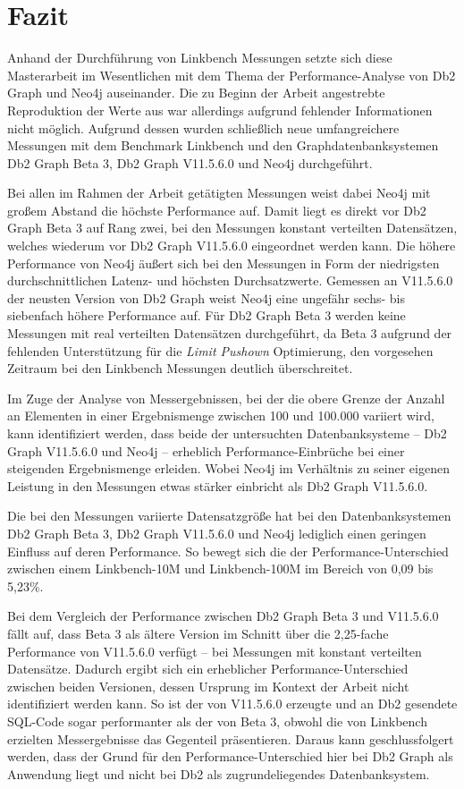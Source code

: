 \chapter{Fazit}
\label{fazit}
Anhand der Durchführung von Linkbench Messungen setzte sich diese Masterarbeit im Wesentlichen mit dem Thema der Performance-Analyse von Db2 Graph und Neo4j auseinander. Die zu Beginn der Arbeit angestrebte Reproduktion der Werte aus \cite{sigmod_tian} war allerdings aufgrund fehlender Informationen nicht möglich. Aufgrund dessen wurden schließlich neue umfangreichere Messungen mit dem Benchmark Linkbench und den Graphdatenbanksystemen Db2 Graph Beta 3, Db2 Graph V11.5.6.0 und Neo4j durchgeführt. 

Bei allen im Rahmen der Arbeit getätigten Messungen weist dabei Neo4j mit großem Abstand die höchste Performance auf. Damit liegt es direkt vor Db2 Graph Beta 3 auf Rang zwei, bei den Messungen konstant verteilten Datensätzen, welches wiederum vor Db2 Graph V11.5.6.0 eingeordnet werden kann. Die höhere Performance von Neo4j äußert sich bei den Messungen in Form der niedrigsten durchschnittlichen Latenz- und höchsten Durchsatzwerte. Gemessen an V11.5.6.0 der neusten Version von Db2 Graph weist Neo4j eine ungefähr sechs- bis siebenfach höhere Performance auf. Für Db2 Graph Beta 3 werden keine Messungen mit real verteilten Datensätzen durchgeführt, da Beta 3 aufgrund der fehlenden Unterstützung für die \textit{Limit Pushown} Optimierung, den vorgesehen Zeitraum bei den Linkbench Messungen deutlich überschreitet.

Im Zuge der Analyse von Messergebnissen, bei der die obere Grenze der Anzahl an Elementen in einer Ergebnismenge zwischen 100 und 100.000 variiert wird, kann identifiziert werden, dass beide der untersuchten Datenbanksysteme -- Db2 Graph V11.5.6.0 und Neo4j -- erheblich Performance-Einbrüche bei einer steigenden Ergebnismenge erleiden. Wobei Neo4j im Verhältnis zu seiner eigenen Leistung in den Messungen etwas stärker einbricht als Db2 Graph V11.5.6.0. 

Die bei den Messungen variierte Datensatzgröße hat bei den Datenbanksystemen Db2 Graph Beta 3, Db2 Graph V11.5.6.0 und Neo4j lediglich einen geringen Einfluss auf deren Performance. So bewegt sich die der Performance-Unterschied zwischen einem Linkbench-10M und Linkbench-100M im Bereich von 0,09 bis 5,23\%.

Bei dem Vergleich der Performance zwischen Db2 Graph Beta 3 und V11.5.6.0 fällt auf, dass Beta 3 als ältere Version im Schnitt über die 2,25-fache Performance von V11.5.6.0 verfügt -- bei Messungen mit konstant verteilten Datensätze. Dadurch ergibt sich ein erheblicher Performance-Unterschied zwischen beiden Versionen, dessen Ursprung im Kontext der Arbeit nicht identifiziert werden kann. So ist der von V11.5.6.0 erzeugte und an Db2 gesendete SQL-Code sogar performanter als der von Beta 3, obwohl die von Linkbench erzielten Messergebnisse das Gegenteil präsentieren. Daraus kann geschlussfolgert werden, dass der Grund für den Performance-Unterschied hier bei Db2 Graph als Anwendung liegt und nicht bei Db2 als zugrundeliegendes Datenbanksystem.

